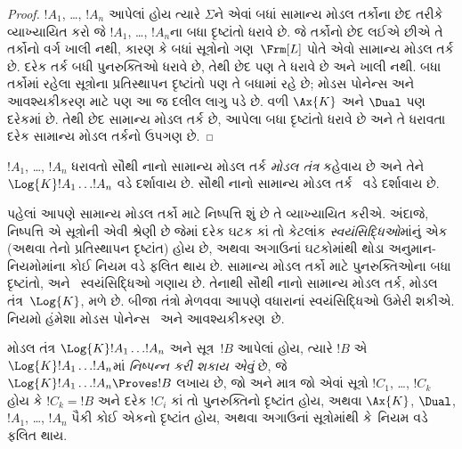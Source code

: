 \begin{proof}
  $!A_1$, \dots, $!A_n$ આપેલાં હોય ત્યારે $\Sigma$ને એવાં બધાં સામાન્ય
  મોડલ તર્કોના છેદ તરીકે વ્યાખ્યાયિત કરો જે $!A_1$, \dots, $!A_n$ના
  બધા દૃષ્ટાંતો ધરાવે છે. જે તર્કોનો છેદ લઈએ છીએ તે તર્કોનો
  વર્ગ ખાલી નથી, કારણ કે બધાં સૂત્રોનો ગણ~$\Frm[L]$
  પોતે એવો સામાન્ય મોડલ તર્ક છે. દરેક તર્ક બધી પુનરુક્તિઓ
  ધરાવે છે, તેથી છેદ પણ તે ધરાવે છે અને ખાલી નથી.
  બધા તર્કોમાં રહેલા સૂત્રોના પ્રતિસ્થાપન દૃષ્ટાંતો પણ
  તે બધામાં રહે છે; મોડસ પોનેન્સ અને આવશ્યકીકરણ માટે પણ
  આ જ દલીલ લાગુ પડે છે. વળી $\Ax{K}$
  અને $\Dual$ પણ દરેકમાં છે.
  તેથી છેદ સામાન્ય મોડલ તર્ક છે, આપેલા બધા દૃષ્ટાંતો
  ધરાવે છે અને તે ધરાવતા દરેક સામાન્ય મોડલ તર્કનો ઉપગણ છે.
\end{proof}

\begin{defn}
$!A_1$, \dots, $!A_n$ ધરાવતો સૌથી નાનો સામાન્ય મોડલ તર્ક
\emph{મોડલ તંત્ર} કહેવાય છે અને તેને $\Log{K} !A_1 \dots
!A_n$ વડે દર્શાવાય છે. સૌથી નાનો સામાન્ય મોડલ તર્ક~ વડે
દર્શાવાય છે.
\end{defn}
\endgroup

\begingroup
\makeatletter{}\makeatother


\label{guunit:OLP-0430}


પહેલાં આપણે સામાન્ય મોડલ તર્કો માટે નિષ્પત્તિ શું છે તે
વ્યાખ્યાયિત કરીએ. અંદાજે, નિષ્પત્તિ એ સૂત્રોની એવી શ્રેણી છે
જેમાં દરેક ઘટક કાં તો કેટલાંક \emph{સ્વયંસિદ્ધિઓ}માંનું એક
(અથવા તેનો પ્રતિસ્થાપન દૃષ્ટાંત) હોય છે, અથવા અગાઉનાં ઘટકોમાંથી
થોડા અનુમાન-નિયમોમાંના કોઈ નિયમ વડે ફલિત થાય છે. સામાન્ય મોડલ તર્કો
માટે પુનરુક્તિઓના બધા દૃષ્ટાંતો,  અને~\Dual{}
સ્વયંસિદ્ધિઓ ગણાય છે. તેનાથી સૌથી નાનો સામાન્ય મોડલ તર્ક, મોડલ
તંત્ર~$\Log{K}$, મળે છે. બીજા તંત્રો મેળવવા આપણે વધારાનાં
સ્વયંસિદ્ધિઓ ઉમેરી શકીએ. નિયમો હંમેશા મોડસ પોનેન્સ~\MP{} અને
આવશ્યકીકરણ~\Nec છે.

\begin{defn}
  મોડલ તંત્ર $\Log{K} !A_1 \dots !A_n$ અને સૂત્ર~$!B$ આપેલાં
  હોય, ત્યારે $!B$ એ $\Log{K} !A_1 \dots
  !A_n$માં \emph{નિષ્પન્ન કરી શકાય એવું} છે, જે
  $\Log{K} !A_1 \dots !A_n \Proves !B$ લખાય છે, જો અને માત્ર જો
  એવાં સૂત્રો $!C_1$, \dots, $!C_k$ હોય કે $!C_k = !B$ અને દરેક
  $!C_i$ કાં તો પુનરુક્તિનો દૃષ્ટાંત હોય, અથવા
  $\Ax{K}$, $\Dual$, $!A_1$,
  \dots, $!A_n$ પૈકી કોઈ એકનો દૃષ્ટાંત હોય, અથવા અગાઉનાં
  સૂત્રોમાંથી \MP{} કે~\Nec નિયમ વડે ફલિત થાય.
\end{defn}

